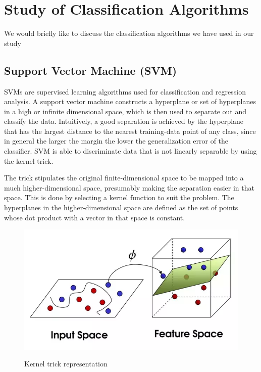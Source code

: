 \chapter{Study of Classification Algorithms} \label{Study of Classification Algorithms}
We would briefly like to discuss the classification algorithms we have used in our study


\section{ Support Vector Machine (SVM)} \label{ Support Vector Machine (SVM)}
\noindent SVMs are supervised learning algorithms used for classification and regression analysis. A support vector machine constructs a hyperplane or set of hyperplanes in a high or infinite dimensional space, which is then used to separate out and classify the data. Intuitively, a good separation is achieved by the hyperplane that has the largest distance to the nearest training-data point of any class, since in general the larger the margin the lower the generalization error of the classifier. SVM is able to discriminate data that is not linearly separable by using the kernel trick. \par 
\noindent The trick stipulates the original finite-dimensional space to be mapped into a much higher-dimensional space, presumably making the separation easier in that space. This is done by selecting a kernel function to suit the problem. The hyperplanes in the higher-dimensional space are defined as the set of points whose dot product with a vector in that space is constant.

\begin{figure}[H]
\centering
{\includegraphics[scale=0.65]{ktr.png}}
\caption{Kernel trick representation}
\end{figure}


